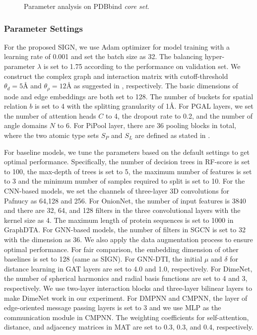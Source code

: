 \documentclass[sigconf]{acmart}
\newcommand{\model}{\textsf{SIGN}\xspace}
\newcommand{\gnn}{PGAL\xspace}
\newcommand{\pool}{PiPool\xspace}
\begin{document}
\begin{figure}
\setlength{\abovecaptionskip}{2.mm}
\setlength{\belowcaptionskip}{-0.cm}
  \centering
  \vspace{-2mm}
  \caption{Parameter analysis on PDBbind \textit{core set}.}
  \vspace{-4mm}
  \label{fig-parameter-add} \end{figure}



\subsubsection{Parameter Settings}
For the proposed \model, we use Adam optimizer for model training with a learning rate of 0.001 and set the batch size as 32. The balancing hyper-parameter $\lambda$ is set to 1.75 according to the performance on validation set. We construct the complex graph and interaction matrix with cutoff-threshold $\theta_d=5Å$ and $\theta_{\rho}=12Å$ as suggested in \cite{muegge1999general}, respectively. The basic dimensions of node and edge embeddings are both set to 128. The number of buckets for spatial relation $b$ is set to 4 with the splitting granularity of 1Å. For \gnn layers, we set the number of attention heads $C$ to 4, the dropout rate to 0.2, and the number of angle domains $N$ to 6. For \pool layer, there are 36 pooling blocks in total, where the two atomic type sets $S_P$ and $S_L$ are defined as stated in \cite{ballester2010machine}. 


For baseline models, we tune the parameters based on the default settings to get optimal performance. Specifically, the number of decision trees in RF-score is set to 100, the max-depth of trees is set to 5, the maximum number of features is set to 3 and the minimum number of samples required to split is set to 10. For the CNN-based models, we set the channels of three-layer 3D convolutions for Pafnucy as 64,128 and 256. For OnionNet, the number of input features is 3840 and there are 32, 64, and 128 filters in the three convolutional layers with the kernel size as 4. The maximum length of protein sequences is set to 1000 in GraphDTA. For GNN-based models, the number of filters in SGCN is set to 32 with the dimension as 36. We also apply the data augmentation process to ensure optimal performance. For fair comparison, the embedding dimension of other baselines is set to 128 (same as \model). For GNN-DTI, the initial $\mu$ and $\delta$ for distance learning in GAT layers are set to 4.0 and 1.0, respectively. For DimeNet, the number of spherical harmonics and radial basis functions are set to 4 and 3, respectively. We use two-layer interaction blocks and three-layer bilinear layers to make DimeNet work in our experiment. For DMPNN and CMPNN, the layer of edge-oriented message passing layers is set to 3 and we use MLP as the communication module in CMPNN. The weighting 
coefficients for self-attention, distance, and adjacency matrices in MAT are set to 0.3, 0.3, and 0.4, respectively.
\vspace{-2mm}
\end{document}
